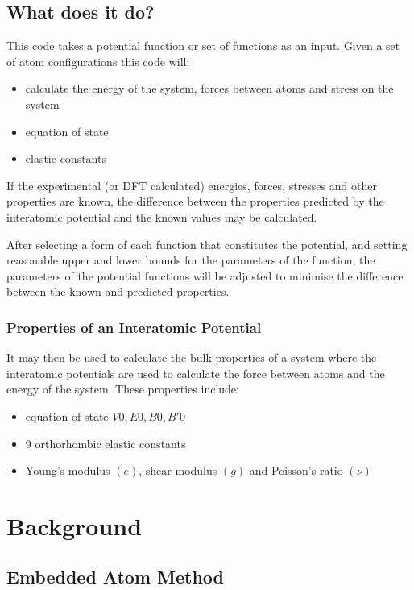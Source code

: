 \documentclass[12pt,twoside]{manual}
\begin{document}
\section{What does it do?}

This code takes a potential function or set of functions as an input.  Given a set of atom configurations this code will:

\begin{itemize}
\item calculate the energy of the system, forces between atoms and stress on the system
\item equation of state
\item elastic constants
\end{itemize}

If the experimental (or DFT calculated) energies, forces, stresses and other properties are known, the difference between the properties predicted by the interatomic potential and the known values may be calculated.

After selecting a form of each function that constitutes the potential, and setting reasonable upper and lower bounds for the parameters of the function, the parameters of the potential functions will be adjusted to minimise the difference between the known and predicted properties.


\subsection{Properties of an Interatomic Potential}

It may then be used to calculate the bulk properties of a system where the interatomic potentials are used to calculate the force between atoms and the energy of the system.  These properties include:

\begin{itemize}
\item equation of state \(V0, E0, B0, B'0\)
\item 9 orthorhombic elastic constants
\item Young's modulus $(e)$, shear modulus $(g)$ and Poisson's ratio $(\nu)$
\end{itemize}




\chapter{Background}


\section{Embedded Atom Method}
\end{document}
